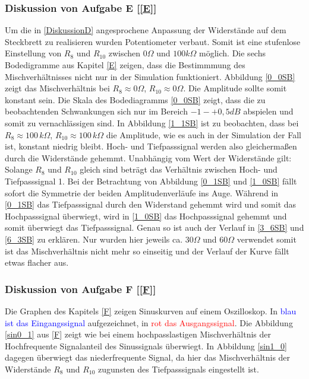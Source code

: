 \subsubsection{Diskussion von Aufgabe E [\ref{E}]}
Um die in \ref{DiskussionD} angesprochene Anpassung der Widerstände auf dem Steckbrett zu realisieren wurden Potentiometer verbaut. Somit ist eine stufenlose Einstellung von $R_{8}$ und $R_{10}$ zwischen $\si{0}{\Omega}$ und $\si{100}{k\Omega}$ möglich. Die sechs Bodedigramme aus Kapitel \ref{E} zeigen, dass die Bestimmmung des Mischverhältnisses nicht nur in der Simulation funktioniert. Abbildung \ref{0_0SB} zeigt das Mischverhältnis bei $R_{8}\approx \si{0}{\Omega}$, $R_{10}\approx \si{0}{\Omega}$. Die Amplitude sollte somit konstant sein. Die Skala des Bodediagramms \ref{0_0SB} zeigt, dass die zu beobachtenden Schwankungen sich nur im Bereich $\si{-1}{-}{+0,5}{dB}$ abspielen und somit zu vernachlässigen sind.
In Abbildung \ref{1_1SB} ist zu beobachten, dass bei $R_{8}\approx \si{100}{\,k\Omega}$, $R_{10}\approx \si{100}{\,k\Omega}$ die Amplitude, wie es auch in der Simulation der Fall ist, konstant niedrig bleibt. Hoch- und Tiefpasssignal werden also gleichermaßen durch die Widerstände gehemmt. Unabhängig vom Wert der Widerstände gilt: Solange $R_{8}$ und $R_{10}$ gleich sind beträgt das Verhältnis zwischen Hoch- und Tiefpasssignal 1.
Bei der Betrachtung von Abbildung \ref{0_1SB} und \ref{1_0SB} fällt sofort die Symmetrie der beiden Amplitudenverläufe ins Auge. Während in \ref{0_1SB} das Tiefpasssignal durch den Widerstand gehemmt wird und somit das Hochpasssignal überwiegt, wird in \ref{1_0SB} das Hochpasssignal gehemmt und somit überwiegt das Tiefpasssignal.
Genau so ist auch der Verlauf in \ref{3_6SB} und \ref{6_3SB} zu erklären. Nur wurden hier jeweils ca. $\si{30}{\Omega}$ und $\si{60}{\Omega}$ verwendet somit ist das Mischverhältnis nicht mehr so einseitig und der Verlauf der Kurve fällt etwas flacher aus.

\subsubsection{Diskussion von Aufgabe F [\ref{F}]}
Die Graphen des Kapitels \ref{F} zeigen Sinuskurven auf einem Oszilloskop. In \textcolor{blue}{blau ist das Eingangssignal} aufgezeichnet, in \textcolor{red}{rot das Ausgangssignal}.
Die Abbildung \ref{sin0_1} aus \ref{F} zeigt wie bei einem hochpasslastigen Mischverhältnis der Hochfrequente Signalanteil des Sinussignals überwiegt.
In Abbildung \ref{sin1_0} dagegen überwiegt das niederfrequente Signal, da hier das Mischverhältnis der Widerstände $R_{8}$ und $R_{10}$ zugunsten des Tiefpasssignals eingestellt ist.
\newpage
